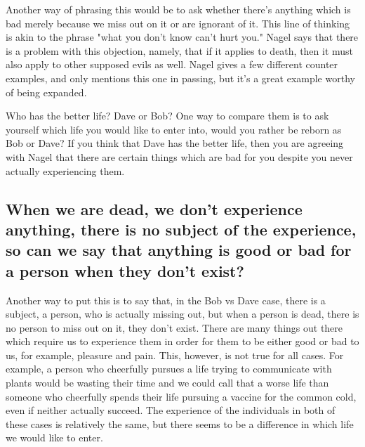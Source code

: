 Another way of phrasing this would be to ask whether there's anything which is bad merely because we miss out on it or are ignorant of it. This line of thinking is akin to the phrase "what you don't know can't hurt you." Nagel says that there is a problem with this objection, namely, that if it applies to death, then it must also apply to other supposed evils as well. Nagel gives a few different counter examples, and only mentions this one in passing, but it's a great example worthy of being expanded. 


Who has the better life? Dave or Bob? One way to compare them is to ask yourself which life you would like to enter into, would you rather be reborn as Bob or Dave? If you think that Dave has the better life, then you are agreeing with Nagel that there are certain things which are bad for you despite you never actually experiencing them.  

\subsection{When we are dead, we don’t experience anything, there is no subject of the experience, so can we say that anything is good or bad for a person when they don’t exist?}

Another way to put this is to say that, in the Bob vs Dave case, there is a subject, a person, who is actually missing out, but when a person is dead, there is no person to miss out on it, they don't exist. There are many things out there which require us to experience them in order for them to be either good or bad to us, for example, pleasure and pain. This, however, is not true for all cases. For example, a person who cheerfully pursues a life trying to communicate with plants would be wasting their time and we could call that a worse life than someone who cheerfully spends their life pursuing a vaccine for the common cold, even if neither actually succeed. The experience of the individuals in both of these cases is relatively the same, but there seems to be a difference in which life we would like to enter.   

